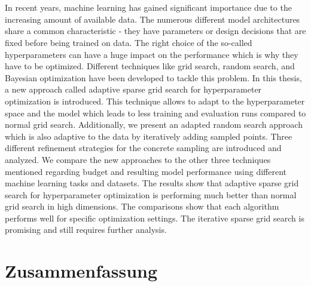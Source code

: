 \chapter{\abstractname}

In recent years, machine learning has gained significant importance due to the increasing amount of available data. The numerous different model architectures share a common characteristic - they have parameters or design decisions that are fixed before being trained on data. The right choice of the so-called hyperparameters can have a huge impact on the performance which is why they have to be optimized. Different techniques like grid search, random search, and Bayesian optimization have been developed to tackle this problem. \newline
In this thesis, a new approach called adaptive sparse grid search for hyperparameter optimization is introduced. This technique allows to adapt to the hyperparameter space and the model which leads to less training and evaluation runs compared to normal grid search. Additionally, we present an adapted random search approach which is also adaptive to the data by iteratively adding sampled points. Three different refinement strategies for the concrete sampling are introduced and analyzed. \newline
We compare the new approaches to the other three techniques mentioned regarding budget and resulting model performance using different machine learning tasks and datasets. The results show that adaptive sparse grid search for hyperparameter optimization is performing much better than normal grid search in high dimensions. The comparisons show that each algorithm performs well for specific optimization settings. The iterative sparse grid search is promising and still requires further analysis.

\chapter*{Zusammenfassung} 
